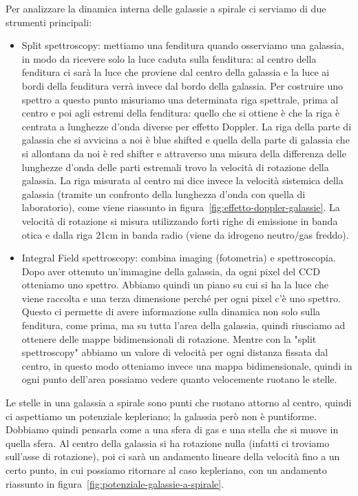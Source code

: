 Per analizzare la dinamica interna delle galassie a spirale ci serviamo di due strumenti principali:
\begin{itemize}
    \item Split spettroscopy: mettiamo una fenditura quando osserviamo una galassia, in modo da ricevere solo la luce caduta sulla fenditura: al centro della fenditura ci sarà la luce che proviene dal centro della galassia e la luce ai bordi della fenditura verrà invece dal bordo della galassia. Per costruire uno spettro a questo punto misuriamo una determinata riga spettrale, prima al centro e poi agli estremi della fenditura: quello che si ottiene è che la riga è centrata a lunghezze d’onda diverse per effetto Doppler. La riga della parte di galassia che si avvicina a noi è blue shifted e quella della parte di galassia che si allontana da noi è red shifter e attraverso una misura della differenza delle lunghezze d’onda delle parti estremali trovo la velocità di rotazione della galassia. La riga misurata al centro mi dice invece la velocità sistemica della galassia (tramite un confronto della lunghezza d’onda con quella di laboratorio), come viene riassunto in figura~\ref{fig:effetto-doppler-galassie}. La velocità di rotazione si misura utilizzando forti righe di emissione in banda otica e dalla riga 21cm in banda radio (viene da idrogeno neutro/gas freddo). 

    \item Integral Field spettroscopy: combina imaging (fotometria) e spettroscopia. Dopo aver ottenuto un’immagine della galassia, da ogni pixel del CCD otteniamo uno spettro. Abbiamo quindi un piano su cui si ha la luce che viene raccolta e una terza dimensione perché per ogni pixel c'è uno spettro. Questo ci permette di avere informazione sulla dinamica non solo sulla fenditura, come prima, ma su tutta l’area della galassia, quindi riusciamo ad ottenere delle mappe bidimensionali di rotazione. Mentre con la "split spettroscopy" abbiamo un valore di velocità per ogni distanza fissata dal centro, in questo modo otteniamo invece una mappa bidimensionale, quindi in ogni punto dell’area possiamo vedere quanto velocemente ruotano le stelle.
\end{itemize}

Le stelle in una galassia a spirale sono punti che ruotano attorno al centro, quindi  ci aspettiamo un potenziale kepleriano; la galassia però non è puntiforme. Dobbiamo quindi pensarla come a una sfera di gas e una stella che si muove in quella sfera. Al centro della galassia si ha rotazione nulla (infatti ci troviamo sull'asse di rotazione), poi ci sarà un andamento lineare della velocità fino a un certo punto, in cui possiamo ritornare al caso kepleriano, con un andamento riassunto in figura~\ref{fig:potenziale-galassie-a-spirale}.

